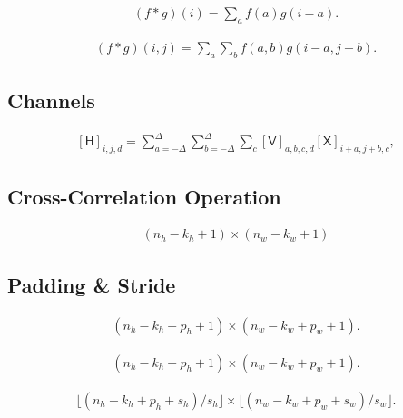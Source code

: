 \documentclass[a4paper,12pt]{article}
\theoremstyle{definition}
\begin{document}
\begin{equation*}
    \begin{aligned}
        (f * g)(i) = \sum_a f(a) g(i-a).
    \end{aligned}
\end{equation*}

\begin{equation*}
    \begin{aligned}
        (f * g)(i, j) = \sum_a\sum_b f(a, b) g(i-a, j-b).
    \end{aligned}
\end{equation*}

\subsection*{Channels}
\begin{equation*}
    \begin{aligned}
        [\mathsf{H}]_{i,j,d} = \sum_{a = -\Delta}^{\Delta} \sum_{b = -\Delta}^{\Delta} \sum_c [\mathsf{V}]_{a, b, c, d} [\mathsf{X}]_{i+a, j+b, c},
    \end{aligned}
\end{equation*}

\subsection*{Cross-Correlation Operation}
\begin{equation*}
    \begin{aligned}
        (n_h-k_h+1) \times (n_w-k_w+1)
    \end{aligned}
\end{equation*}

\subsection{Padding \& Stride}
\begin{equation*}
    \begin{aligned}
        (n_h-k_h+p_h+1)\times(n_w-k_w+p_w+1).
    \end{aligned}
\end{equation*}

\begin{equation*}
    \begin{aligned}
        (n_h-k_h+p_h+1)\times(n_w-k_w+p_w+1).
    \end{aligned}
\end{equation*}

\begin{equation*}
    \begin{aligned}
        \lfloor(n_h-k_h+p_h+s_h)/s_h\rfloor \times \lfloor(n_w-k_w+p_w+s_w)/s_w\rfloor.
    \end{aligned}
\end{equation*}
\end{document}
